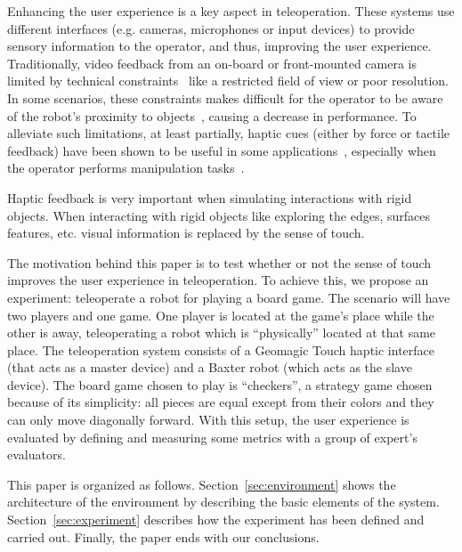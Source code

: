 \documentclass[journal,twoside]{JoPhA}
\begin{document}
  Enhancing the user experience is a key aspect in teleoperation. These systems use different interfaces (e.g. cameras, microphones or input devices) to provide sensory information to the operator, and thus, improving the user experience. Traditionally, video feedback from an on-board or front-mounted camera is limited by technical constraints~\cite{Woods04,Woods97} like a restricted field of view or poor resolution. In some scenarios, these constraints makes difficult for the operator to be aware of the robot's proximity to objects~\cite{Alfano90}, causing a decrease in performance. To alleviate such limitations, at least partially, haptic cues (either by force or tactile feedback) have been shown to be useful in some applications~\cite{Son13,Sitti03,Diolaiti02}, especially when the operator performs manipulation tasks~\cite{King09,Kron04}.
  
  Haptic feedback is very important when simulating interactions with rigid objects. When interacting with rigid objects like exploring the edges, surfaces features, etc. visual information is replaced by the sense of touch.  %

  
  
  The motivation behind this paper is to test whether or not the sense of touch improves the user experience in teleoperation. To achieve this, we propose an experiment: teleoperate a robot for playing a board game. The scenario will have two players and one game. One player is located at the game's place while the other is away, teleoperating a robot which is ``physically'' located at that same place. The teleoperation system consists of a Geomagic Touch haptic interface (that acts as a master device) and a Baxter robot (which acts as the slave device). The board game chosen to play is ``checkers'', a strategy game chosen because of its simplicity: all pieces are equal except from their colors and they can only move diagonally forward. With this setup, the user experience is evaluated by defining and measuring some metrics with a group of expert's evaluators.

  This paper is organized as follows. Section~\ref{sec:environment} shows the architecture of the environment by describing the basic elements of the system. Section~\ref{sec:experiment} describes how the experiment has been defined and carried out. Finally, the paper ends with our conclusions.
\end{document}
